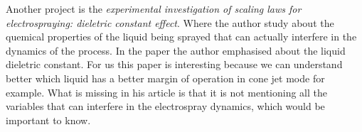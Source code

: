 \documentclass[10pt]{article}
\begin{document}
Another project is the \emph{experimental investigation of scaling laws for electrospraying: dieletric constant effect}\cite*[]{Chen_Pui}.
Where the author study about the quemical properties of the liquid being sprayed that can actually interfere in the dynamics of the process. 
In the paper the author emphasised about the liquid dieletric constant. For us this paper is interesting because we can understand better which liquid
has a better margin of operation in cone jet mode for example. What is missing in his article is that it is not mentioning all the variables that can interfere in the 
electrospray dynamics, which would be important to know.



\pagebreak
\printbibliography
\end{document}
